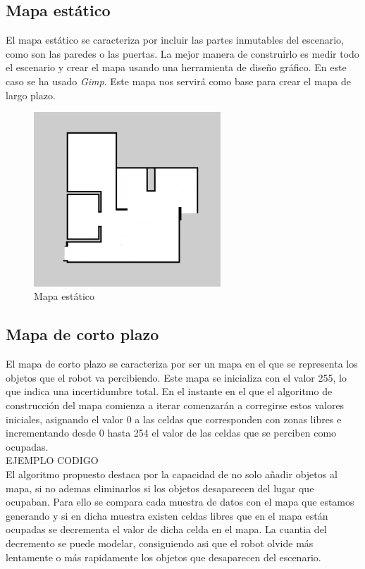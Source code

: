 \subsection{Mapa estático}
El mapa estático se caracteriza por incluir las partes inmutables del escenario, como son las paredes o las puertas. La mejor manera de construirlo es medir todo el escenario y crear el mapa usando una herramienta de diseño gráfico. En este caso se ha usado \textit{Gimp}.
Este mapa nos servirá como base para crear el mapa de largo plazo.

\begin{figure} [hbtp]
  \begin{center}
    \includegraphics[width=7cm]{img/cap4/mapaestatico}
  \end{center}
  \caption{Mapa estático}
  \label{fig:mapaestatico}
\end{figure}

\subsection{Mapa de corto plazo}
El mapa de corto plazo se caracteriza por ser un mapa en el que se representa los objetos que el robot va percibiendo. Este mapa se inicializa con el valor 255, lo que indica una incertidumbre total. En el instante en el que el algoritmo de construcción del mapa comienza a iterar comenzarán a corregirse estos valores iniciales, asignando el valor 0 a las celdas que corresponden con zonas libres e incrementando desde 0 hasta 254 el valor de las celdas que se perciben como ocupadas. \\

{EJEMPLO CODIGO}\\

El algoritmo propuesto destaca por la capacidad de no solo añadir objetos al mapa, si no ademas eliminarlos si los objetos desaparecen del lugar que ocupaban. Para ello se compara cada muestra de datos con el mapa que estamos generando y si en dicha muestra existen celdas libres que en el mapa están ocupadas se decrementa el valor de dicha celda en el mapa. La cuantia del decremento se puede modelar, consiguiendo asi que el robot olvide más lentamente o más rapidamente los objetos que desaparecen del escenario.\\

